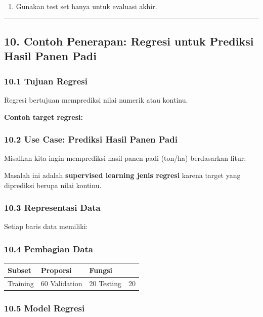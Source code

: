 \documentclass[12pt,a4paper]{article}
\begin{document}
\begin{enumerate}
\item Gunakan test set hanya untuk evaluasi akhir.
\end{enumerate}


\hrule


\subsection{10. Contoh Penerapan: Regresi untuk Prediksi Hasil Panen Padi}

\subsubsection{10.1 Tujuan Regresi}

Regresi bertujuan memprediksi nilai numerik atau kontinu.


\textbf{Contoh target regresi:}


\subsubsection{10.2 Use Case: Prediksi Hasil Panen Padi}

Misalkan kita ingin memprediksi hasil panen padi (ton/ha) berdasarkan fitur:


Masalah ini adalah \textbf{supervised learning jenis regresi} karena target yang diprediksi berupa nilai kontinu.


\subsubsection{10.3 Representasi Data}

Setiap baris data memiliki:


\subsubsection{10.4 Pembagian Data}

\begin{tabular}{|l|l|l|}
\hline
Subset & Proporsi & Fungsi \\
\hline
Training & 60%
\hline
Validation & 20%
\hline
Testing & 20%
\hline
\end{tabular}


\subsubsection{10.5 Model Regresi}
\end{document}
